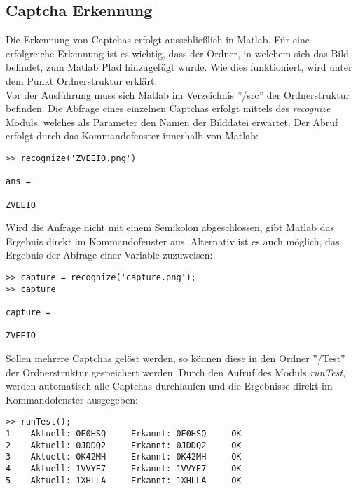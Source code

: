 \subsection{Captcha Erkennung}
Die Erkennung von Captchas erfolgt ausschließlich in Matlab. Für eine erfolgreiche Erkennung ist es wichtig, dass der Ordner, in welchem sich das Bild befindet, zum Matlab Pfad hinzugefügt wurde. Wie dies funktioniert, wird unter dem Punkt Ordnerstruktur erklärt.\\
Vor der Ausführung muss sich Matlab im Verzeichnis ''/src'' der Ordnerstruktur befinden. Die Abfrage eines einzelnen Captchas erfolgt mittels des \textit{recognize} Moduls, welches als Parameter den Namen der Bilddatei erwartet. Der Abruf erfolgt durch das Kommandofenster innerhalb von Matlab:
\begin{verbatim}
>> recognize('ZVEEIO.png')

ans =

ZVEEIO
\end{verbatim} 
Wird die Anfrage nicht mit einem Semikolon abgeschlossen, gibt Matlab das Ergebnis direkt im Kommandofenster aus. Alternativ ist es auch möglich, das Ergebnis der Abfrage einer Variable zuzuweisen:
\begin{verbatim}
>> capture = recognize('capture.png');
>> capture

capture =

ZVEEIO
\end{verbatim} 
$\;$ \\
Sollen mehrere Captchas gelöst werden, so können diese in den Ordner ''/Test'' der Ordnerstruktur gespeichert werden. Durch den Aufruf des Moduls \textit{runTest}, werden automatisch alle Captchas durchlaufen und die Ergebnisse direkt im Kommandofenster ausgegeben:
\begin{verbatim}
>> runTest();
1	 Aktuell: 0E0HSQ	 Erkannt: 0E0HSQ	 OK
2	 Aktuell: 0JDDQ2	 Erkannt: 0JDDQ2	 OK
3	 Aktuell: 0K42MH	 Erkannt: 0K42MH	 OK
4	 Aktuell: 1VVYE7	 Erkannt: 1VVYE7	 OK
5	 Aktuell: 1XHLLA	 Erkannt: 1XHLLA	 OK
\end{verbatim} 